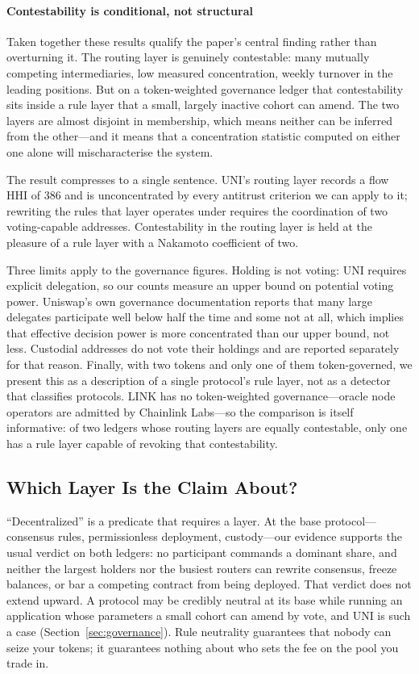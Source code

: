 \documentclass[final,5p,times]{elsarticle}
\begin{document}
\paragraph{Contestability is conditional, not structural}
Taken together these results qualify the paper's central finding rather than
overturning it. The routing layer is genuinely contestable: many mutually
competing intermediaries, low measured concentration, weekly turnover in the
leading positions. But on a token-weighted governance ledger that
contestability sits inside a rule layer that a small, largely inactive cohort
can amend. The two layers are almost disjoint in membership, which means
neither can be inferred from the other---and it means that a
concentration statistic computed on either one alone will mischaracterise
the system.

The result compresses to a single sentence. UNI's routing layer records a
flow HHI of $386$ and is unconcentrated by every antitrust criterion we can
apply to it; rewriting the rules that layer operates under requires the
coordination of two voting-capable addresses. Contestability in the routing
layer is held at the pleasure of a rule layer with a Nakamoto coefficient of
two.

Three limits apply to the governance figures. Holding is not voting: UNI
requires explicit delegation, so our counts measure an upper bound on
potential voting power. Uniswap's own governance documentation reports that
many large delegates participate well below half the time and some not at
all, which implies that effective decision power is more concentrated than
our upper bound, not less. Custodial addresses do not vote their holdings and
are reported separately for that reason. Finally, with two tokens and only
one of them token-governed, we present this as a description of a single
protocol's rule layer, not as a detector that classifies protocols. LINK has
no token-weighted governance---oracle node operators are admitted by
Chainlink Labs---so the comparison is itself informative: of two ledgers
whose routing layers are equally contestable, only one has a rule layer
capable of revoking that contestability.

\subsection{Which Layer Is the Claim About?}
``Decentralized'' is a predicate that requires a layer. At the base
protocol---consensus rules, permissionless deployment, custody---our evidence
supports the usual verdict on both ledgers: no participant commands a
dominant share, and neither the largest holders nor the busiest routers can
rewrite consensus, freeze balances, or bar a competing contract from being
deployed. That verdict does not extend upward. A protocol may be credibly
neutral at its base while running an application whose parameters a small
cohort can amend by vote, and UNI is such a case
(Section~\ref{sec:governance}). Rule neutrality guarantees that nobody can
seize your tokens; it guarantees nothing about who sets the fee on the pool
you trade in.
\end{document}
